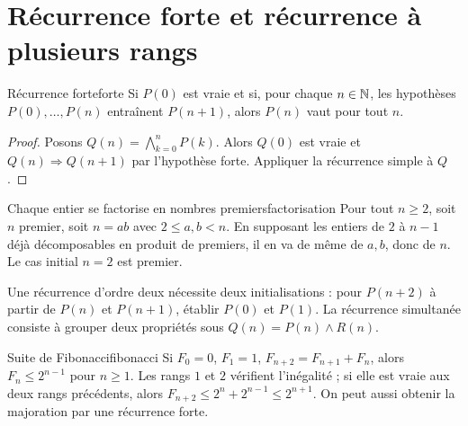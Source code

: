 \section{Récurrence forte et récurrence à plusieurs rangs}
\begin{theoreme}{Récurrence forte}{forte}
Si $P(0)$ est vraie et si, pour chaque $n\in\mathbb N$, les hypothèses $P(0),\ldots,P(n)$ entraînent $P(n+1)$, alors $P(n)$ vaut pour tout $n$.
\end{theoreme}
\begin{proof}
Posons $Q(n)=\bigwedge_{k=0}^nP(k)$. Alors $Q(0)$ est vraie et $Q(n)\Rightarrow Q(n+1)$ par l'hypothèse forte. Appliquer la récurrence simple à $Q$.
\end{proof}
\begin{exemple}{Chaque entier se factorise en nombres premiers}{factorisation}
Pour tout $n\ge2$, soit $n$ premier, soit $n=ab$ avec $2\le a,b<n$. En supposant les entiers de $2$ à $n-1$ déjà décomposables en produit de premiers, il en va de même de $a,b$, donc de $n$. Le cas initial $n=2$ est premier.
\end{exemple}
Une récurrence d'ordre deux nécessite deux initialisations : pour $P(n+2)$ à partir de $P(n)$ et $P(n+1)$, établir $P(0)$ et $P(1)$. La récurrence simultanée consiste à grouper deux propriétés sous $Q(n)=P(n)\wedge R(n)$.
\begin{exemple}{Suite de Fibonacci}{fibonacci}
Si $F_0=0$, $F_1=1$, $F_{n+2}=F_{n+1}+F_n$, alors $F_n\le2^{n-1}$ pour $n\ge1$. Les rangs $1$ et $2$ vérifient l'inégalité ; si elle est vraie aux deux rangs précédents, alors $F_{n+2}\le2^n+2^{n-1}\le2^{n+1}$. On peut aussi obtenir la majoration par une récurrence forte.
\end{exemple}


